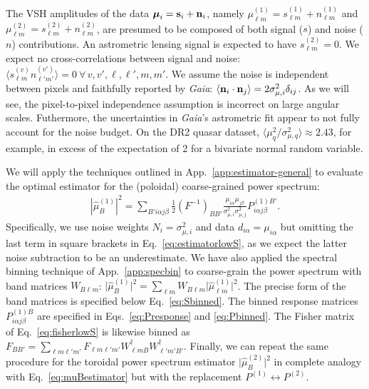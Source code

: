 \documentclass[prd,aps,twocolumn,nofootinbib,superscriptaddress,preprintnumbers,balancelastpage,longbibliography,floatfix]{revtex4-1}
\begin{document}
The VSH amplitudes of the data $\boldsymbol{\mathbf{\mu}}_i = \boldsymbol{\mathbf{s}}_i + \boldsymbol{\mathbf{n}}_i$, namely $\mu_{\ell m}^{(1)} = s^{(1)}_{\ell m} + n^{(1)}_{\ell m}$ and $\mu_{\ell m}^{(2)} = s^{(2)}_{\ell m} + n^{(2)}_{\ell m}$, are presumed to be composed of both signal ($s$) and noise ($n$)  contributions. An astrometric lensing signal is expected to have $s_{\ell m}^{(2)} = 0$. We expect no cross-correlations between signal and noise:  $\langle s_{\ell m}^{(v)}  n_{\ell' m'}^{(v')} \rangle = 0 ~ \forall \, v,v',\ell,\ell',m,m'$. We assume the noise is independent between pixels and faithfully reported by \textit{Gaia}: $\langle \boldsymbol{\mathbf{n}}_i \cdot \boldsymbol{\mathbf{n}}_j \rangle = 2 \sigma_{\mu,i}^2 \delta_{ij}$. As we will see, the pixel-to-pixel independence assumption is incorrect on large angular scales. Futhermore, the uncertainties in \textit{Gaia}'s astrometric fit appear to not fully account for the noise budget. On the DR2 quasar dataset, $\langle \mu_q^2 / \sigma_{\mu,q}^2 \rangle \approx 2.43$, for example, in excess of the expectation of 2 for a bivariate normal random variable. 

We will apply the techniques outlined in App.~\ref{app:estimator-general} to evaluate the optimal estimator for the (poloidal) coarse-grained power spectrum:
\begin{align}
\left|\hat{\mu}^{(1)}_{B}\right|^2 = \sum_{B' i \alpha j \beta} \frac{1}{2}\left(F^{-1}\right)_{B B'} \frac{\mu_{i\alpha} \mu_{j \beta}}{\sigma_{\mu,i}^2 \sigma_{\mu,j}^2} P^{(1) B'}_{i \alpha j \beta}. \label{eq:muBestimator}
\end{align}
Specifically, we use noise weights $N_i = \sigma_{\mu,i}^2$ and data $d_{i\alpha} = \mu_{i\alpha}$ but omitting the last term in square brackets in Eq.~\ref{eq:estimatorlowS}, as we expect the latter noise subtraction to be an underestimate. We have also applied the spectral binning technique of App.~\ref{app:specbin} to coarse-grain the power spectrum with band matrices $W_{B\ell m}$: $\big|\hat{\mu}^{(1)}_{B}\big|^2 = \sum_{\ell m} W_{B \ell m} \big|\hat{\mu}^{(1)}_{\ell m}\big|^2$. The precise form of the band matrices is specified below Eq.~\ref{eq:Sbinned}. The binned response matrices $P^{(1)B}_{i \alpha j \beta}$ are specified in Eqs.~\ref{eq:Presponse} and \ref{eq:Pbinned}. The Fisher matrix of Eq.~\ref{eq:fisherlowS} is likewise binned as $F_{B B'} = \sum_{\ell m \ell' m'} F_{\ell m \ell' m'} W^\dagger_{\ell m B} W^\dagger_{\ell' m' B'}$. Finally, we can repeat the same procedure for the toroidal power spectrum estimator $\big|\hat{\mu}^{(2)}_{B}\big|^2$ in complete analogy with Eq.~\ref{eq:muBestimator} but with the replacement $P^{(1)} \leftrightarrow P^{(2)}$.
\end{document}
